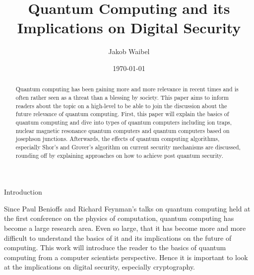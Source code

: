 \documentclass[aps,preprintnumbers,twocolumn]{revtex4}
\begin{document}
\title{Quantum Computing and its Implications on Digital Security}
\author{Jakob Waibel}


\date{\today}

\begin{abstract}
Quantum computing has been gaining more and more relevance in recent times and is often rather seen as a threat than a blessing by society. This paper aims to inform readers about the topic on a high-level to be able to join the discussion about the future relevance of quantum computing. First, this paper will explain the basics of quantum computing and dive into types of quantum computers including ion traps, nuclear magnetic resonance quantum computers and quantum computers based on josephson junctions. Afterwards, the effects of quantum computing algorithms, especially Shor's and Grover's algorithm on current security mechanisms are discussed, rounding off by explaining approaches on how to achieve post quantum security.
\end{abstract}

\maketitle

\begin{section}{Introduction}
    
Since Paul Benioffs and Richard Feynman's talks on quantum computing held at the first conference on the physics of computation, 
quantum computing has become a large research area. 
Even so large, that it has become more and more difficult to understand the basics of it and its implications on the future of computing. 
This work will introduce the reader to the basics of quantum computing from a computer scientists perspective. 
Hence it is important to look at the implications on digital security, especially cryptography.

\end{section}
\end{document}

